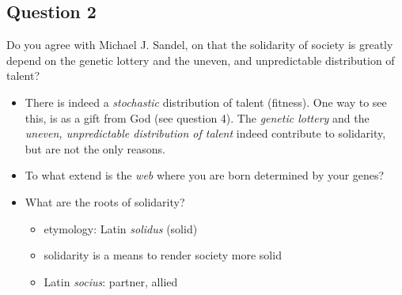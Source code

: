 \documentclass[../main/main.tex]{subfiles}
\begin{document}
\subsection{Question 2}  Do you agree with Michael J. Sandel, on that the solidarity of society is greatly depend on the genetic lottery and the uneven, and unpredictable distribution of talent?

\begin{itemize}
\item There is indeed a \textit{stochastic} distribution of talent (fitness). One way to see this, is as a gift from God (see question 4). The \textit{genetic lottery} and the \textit{uneven, unpredictable distribution of talent} indeed contribute to solidarity, but are not the only reasons.

\item To what extend is the \textit{web} where you are born determined by your genes?

\item What are the roots of solidarity? 
\begin{itemize}
\item etymology: Latin \textit{solidus} (solid)
\item solidarity is a means to render society more solid
\item Latin \textit{socius}: partner, allied
\end{itemize}
\end{itemize}
\end{document}
